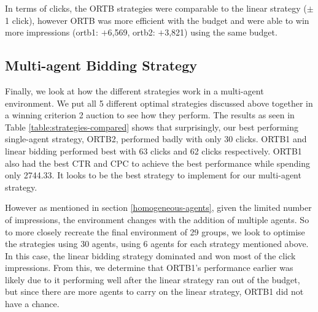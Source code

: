 \documentclass{sig-alternate-05-2015}
\begin{document}
\begin{table}[h!]
  \centering
	\caption{ORTB 2 performance}
	\label{table:ortb2-performance}
\end{table}

In terms of clicks, the ORTB strategies were comparable to the linear strategy ($\pm$ 1 click), however ORTB was more efficient with the budget and were able to win more impressions (ortb1: $+$6,569, ortb2: $+$3,821) using the same budget. 

\subsection{Multi-agent Bidding Strategy}
Finally, we look at how the different strategies work in a multi-agent environment. We put all 5 different optimal strategies discussed above together in a winning criterion 2 auction to see how they perform. The results as seen in Table \ref{table:strategies-compared} shows that surprisingly, our best performing single-agent strategy, ORTB2, performed badly with only 30 clicks. ORTB1 and linear bidding performed best with 63 clicks and 62 clicks respectively. ORTB1 also had the best CTR and CPC to achieve the best performance while spending only 2744.33. It looks to be the best strategy to implement for our multi-agent strategy.

However as mentioned in section \ref{homogeneous-agents}, given the limited number of impressions, the environment changes with the addition of multiple agents. So to more closely recreate the final environment of 29 groups, we look to optimise the strategies using 30 agents, using 6 agents for each strategy mentioned above. In this case, the linear bidding strategy dominated and won most of the click impressions. From this, we determine that ORTB1's performance earlier was likely due to it performing well after the linear strategy ran out of the budget, but since there are more agents to carry on the linear strategy, ORTB1 did not have a chance. 
\end{document}
